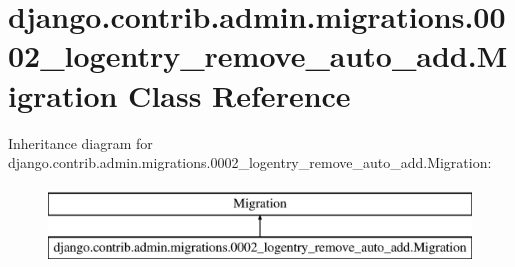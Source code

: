 \hypertarget{classdjango_1_1contrib_1_1admin_1_1migrations_1_10002__logentry__remove__auto__add_1_1_migration}{}\section{django.\+contrib.\+admin.\+migrations.0002\+\_\+logentry\+\_\+remove\+\_\+auto\+\_\+add.Migration Class Reference}
\label{classdjango_1_1contrib_1_1admin_1_1migrations_1_10002__logentry__remove__auto__add_1_1_migration}
Inheritance diagram for django.\+contrib.\+admin.\+migrations.0002\+\_\+logentry\+\_\+remove\+\_\+auto\+\_\+add.Migration\+:\begin{figure}[H]
\begin{center}
\leavevmode
\includegraphics[height=2.000000cm]{classdjango_1_1contrib_1_1admin_1_1migrations_1_10002__logentry__remove__auto__add_1_1_migration}
\end{center}
\end{figure}
